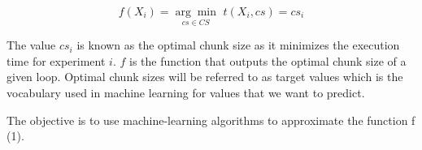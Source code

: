 \begin{equation}
	f(X_i)=\underset{cs \in CS}{\arg\min} \, \, t(X_i,cs)=cs_i
\end{equation}


The  value $cs_i$ is known as the optimal chunk size as it minimizes the execution time for experiment $i$. $f$ is the function that outputs the optimal chunk size of a given loop. Optimal chunk sizes will be referred to as target values which is the vocabulary used in machine learning for values that we want to predict.

The objective is to use machine-learning algorithms to approximate the function f (1).

